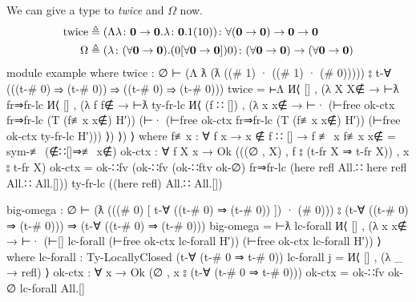 \documentclass[logo,bsc,singlespacing,parskip,online]{infthesis}
\renewenvironment{code}{\mintedcopy[breaklines,breaksymbolleft=\;]{agda}}{\endmintedcopy}
\begin{document}
We can give a type to \textit{twice} and $\Omega$ now.
\begin{align}
\label{equation:twice_big_omega}
  \text{twice} &\triangleq (\Lambda \lambda \colon \mathbf{0} \to \mathbf{0}. \lambda \colon \mathbf{0}. 1(10))
    \colon \forall (\mathbf{0} \to \mathbf{0}) \to \mathbf{0} \to \mathbf{0}\\
  \Omega &\triangleq (\lambda \colon (\forall \mathbf{0} \to \mathbf{0}). (0 [\forall \mathbf{0} \to \mathbf{0}]) 0)
    \colon (\forall \mathbf{0} \to \mathbf{0}) \to (\forall \mathbf{0} \to \mathbf{0}) \notag
\end{align}
\begin{code}
  module example where
    twice : ∅ ⊢ (Λ ƛ (ƛ ((# 1) · ((# 1) · (# 0)))))
        ⦂ t-∀ (((t-# 0) ⇒ (t-# 0))
          ⇒ ((t-# 0) ⇒ (t-# 0)))
    twice = ⊢Λ И⟨ [] , (λ X {X∉} → ⊢ƛ fr⇒fr-lc И⟨ [] , (λ f {f∉} →
      ⊢ƛ ty-fr-lc И⟨ (f ∷ []) , (λ x {x∉} → ⊢·
        (⊢free ok-ctx fr⇒fr-lc (T (f≢x x∉) H′))
        (⊢· (⊢free ok-ctx fr⇒fr-lc (T (f≢x x∉) H′)) (⊢free ok-ctx ty-fr-lc H′))) ⟩) ⟩) ⟩
      where
        f≢x : ∀ {f x} → x ∉ f ∷ [] → f ≢ x
        f≢x x∉ = sym-≢ (∉∷[]⇒≢ x∉)
        ok-ctx : ∀ {f X x} → Ok (((∅ , X) , f ⦂ (t-fr X ⇒ t-fr X)) , x ⦂ t-fr X)
        ok-ctx = ok-∷fv
                   (ok-∷fv (ok-∷ftv ok-∅)
                     fr⇒fr-lc
                     (here refl All.∷ here refl All.∷ All.[]))
                   ty-fr-lc
                   ((here refl) All.∷ All.[])

    big-omega : ∅ ⊢ (ƛ (((# 0) [ t-∀ ((t-# 0) ⇒ (t-# 0)) ]) · (# 0)))
        ⦂ (t-∀ ((t-# 0) ⇒ (t-# 0)))
          ⇒ (t-∀ ((t-# 0) ⇒ (t-# 0)))
    big-omega =
      ⊢ƛ lc-forall И⟨ [] , (λ x {x∉} → ⊢· (⊢[] lc-forall (⊢free ok-ctx lc-forall H′)) (⊢free ok-ctx lc-forall H′)) ⟩
        where
          lc-forall : Ty-LocallyClosed (t-∀ (t-# 0 ⇒ t-# 0))
          lc-forall j = И⟨ [] , (λ _ → refl) ⟩
          ok-ctx : ∀ {x} →  Ok (∅ , x ⦂ (t-∀ (t-# 0 ⇒ t-# 0)))
          ok-ctx = ok-∷fv ok-∅ lc-forall All.[]
\end{code}
\end{document}
